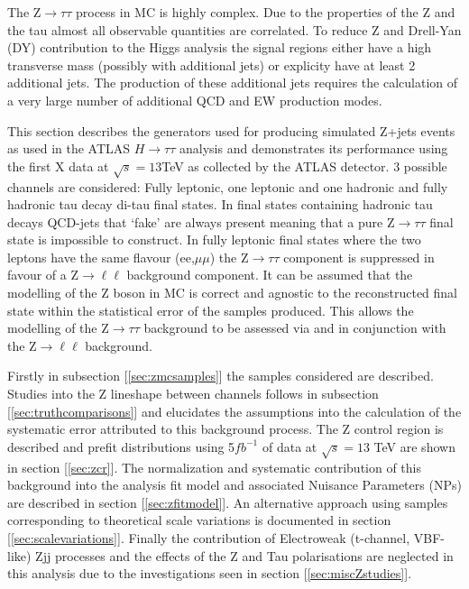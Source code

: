 The Z$\rightarrow\tau\tau$ process in MC is highly complex. Due to the properties of the Z and the tau almost all observable quantities are correlated. To reduce Z and Drell-Yan (DY) contribution to the Higgs analysis the signal regions either have a high transverse mass (possibly with additional jets) or explicity have at least 2 additional jets. The production of these additional jets requires the calculation of a very large number of additional QCD and EW production modes.

This section describes the generators used for producing simulated Z+jets events as used in the ATLAS $H\rightarrow\tau\tau$ analysis and demonstrates its performance using the first X data at $\sqrt{s}=13$TeV as collected by the ATLAS detector. 3 possible channels are considered: Fully leptonic, one leptonic and one hadronic and fully hadronic tau decay di-tau final states. In final states containing hadronic tau decays QCD-jets that `fake' are always present meaning that a pure Z$\rightarrow\tau\tau$ final state is impossible to construct. In fully leptonic final states where the two leptons have the same flavour (ee,$\mu\mu$) the Z$\rightarrow\tau\tau$ component is suppressed in favour of a Z$\rightarrow\ell\ell$ background component. It can be assumed that the modelling of the Z boson in MC is correct and agnostic to the reconstructed final state within the statistical error of the samples produced. This allows the modelling of the Z$\rightarrow\tau\tau$ background to be assessed via and in conjunction with the Z$\rightarrow\ell\ell$ background. 

Firstly in subsection [\ref{sec:zmcsamples}] the samples considered are described. Studies into the Z lineshape between channels follows in subsection [\ref{sec:truthcomparisons}] and elucidates the assumptions into the calculation of the systematic error attributed to this background process.  The Z control region is described and prefit distributions using 5$fb^{-1}$ of data at $\sqrt{s} = 13$ TeV are shown in section [\ref{sec:zcr}]. The normalization and systematic contribution of this background into the analysis fit model and associated Nuisance Parameters (NPs) are described in section [\ref{sec:zfitmodel}]. An alternative approach using samples corresponding to theoretical scale variations is documented in section [\ref{sec:scalevariations}]. Finally the contribution of Electroweak (t-channel, VBF-like) Zjj processes and the effects of the Z and Tau polarisations are neglected in this analysis due to the investigations seen in section [\ref{sec:miscZstudies}].